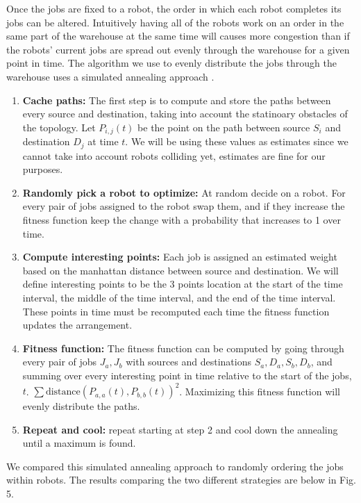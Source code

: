 \documentclass[11pt]{article}
\begin{document}
Once the jobs are fixed to a robot, the order in which each robot completes its jobs can be altered. Intuitively having all of the robots work on an order in the same part of the warehouse at the same time will causes more congestion than if the robots' current jobs are spread out evenly through the warehouse for a given point in time. The algorithm we use to evenly distribute the jobs through the warehouse uses a simulated annealing approach \cite{Bertsimas:98}.

\begin{enumerate}
\item \textbf{Cache paths:} The first step is to compute and store the paths between every source and destination, taking into account the statinoary obstacles of the topology. Let $P_{i,j}(t)$ be the point on the path between source $S_i$ and destination $D_j$ at time $t$. We will be using these values as estimates since we cannot take into account robots colliding yet, estimates are fine for our purposes.

\item \textbf{Randomly pick a robot to optimize:} At random decide on a robot. For every pair of jobs assigned to the robot swap them, and if they increase the fitness function keep the change with a probability that increases to 1 over time.

\item \textbf{Compute interesting points:} Each job is assigned an estimated weight based on the manhattan distance between source and destination. We will define interesting points to be the 3 points location at the start of the time interval, the middle of the time interval, and the end of the time interval. These points in time must be recomputed each time the fitness function updates the arrangement.

\item \textbf{Fitness function:} The fitness function can be computed by going through every pair of jobs $J_a, J_b$ with sources and destinations $S_a, D_a, S_b, D_b$, and summing over every interesting point in time relative to the start of the jobs, $t$. $\displaystyle \sum \text{distance}(P_{a, a}(t), P_{b, b}(t))^2$. Maximizing this fitness function will evenly distribute the paths.

\item \textbf{Repeat and cool:} repeat starting at step 2 and cool down the annealing until a maximum is found.
\end{enumerate}

We compared this simulated annealing approach to randomly ordering the jobs within robots. The results comparing the two different strategies are below in Fig. 5. \\
\end{document}
